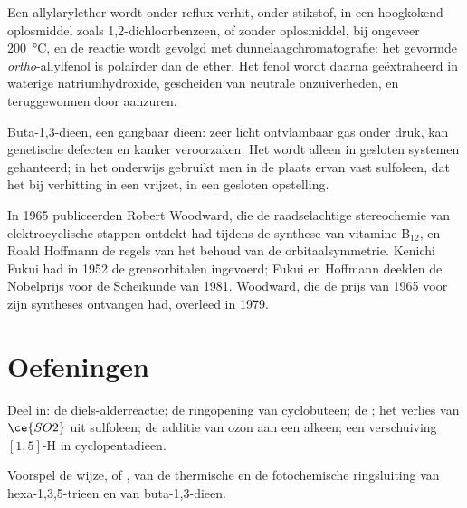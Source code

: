 \begin{inthelab}
Een allylarylether wordt onder reflux verhit, onder stikstof, in een
hoogkokend oplosmiddel zoals 1,2-dichloorbenzeen, of zonder oplosmiddel,
bij ongeveer \qty{200}{\celsius}, en de reactie wordt gevolgd met
dunnelaagchromatografie: het gevormde \textit{ortho}-allylfenol
is polairder dan de ether. Het fenol wordt daarna geëxtraheerd in
waterige natriumhydroxide, gescheiden van neutrale onzuiverheden, en
teruggewonnen door aanzuren.
\end{inthelab}

\begin{safety}{}
Buta-1,3-dieen, een gangbaar dieen: zeer licht ontvlambaar gas onder
druk, kan genetische defecten en kanker veroorzaken. Het wordt alleen in
gesloten systemen gehanteerd; in het onderwijs gebruikt men in de plaats
ervan vast sulfoleen, dat het bij verhitting in een 
vrijzet, in een gesloten opstelling.
\end{safety}

\begin{history}[Orbitaalsymmetrie]
In 1965 publiceerden Robert Woodward, die de raadselachtige
stereochemie van elektrocyclische stappen ontdekt had tijdens de synthese
van vitamine B$_{12}$, en Roald Hoffmann de regels van het behoud van de
orbitaalsymmetrie. Kenichi Fukui had in 1952 de grensorbitalen
ingevoerd; Fukui en Hoffmann deelden de Nobelprijs voor de Scheikunde van
1981. Woodward, die de prijs van 1965 voor zijn syntheses ontvangen had,
overleed in 1979.
\end{history}

\section{Oefeningen}

\begin{exercise}[$\star$]\label{exo:b3:pericyclic:1}
Deel in: de diels-alderreactie; de ringopening van cyclobuteen; de
; het verlies van $\ce{SO2}$ uit sulfoleen; de additie van ozon aan een alkeen;
een verschuiving $[1,5]$-H in cyclopentadieen.
\end{exercise}

\begin{exercise}[$\star$]\label{exo:b3:pericyclic:2}
Voorspel de wijze,  of , van de thermische en
de fotochemische ringsluiting van hexa-1,3,5-trieen en van
buta-1,3-dieen.
\end{exercise}

